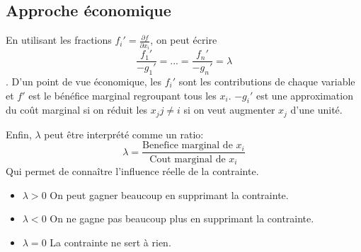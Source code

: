 \subsection{Approche économique}
En utilisant les fractions $f_i' = \frac{\partial f}{\partial x_i}$, on peut
écrire $$ \frac{f_1'}{-g_1'} = ... = \frac{f_n'}{-g_n'} = \lambda $$.
D'un point de vue économique, les $f_i'$ sont les contributions de chaque
variable et $f'$ est le bénéfice marginal regroupant tous les $x_i$.
$-g_i'$ est une approximation du coût marginal si on réduit les $x_j j\neq i$
si on veut augmenter $x_j$ d'une unité.

Enfin, $\lambda$ peut être interprété comme un ratio:
$$\lambda = \frac{\textrm{Benefice marginal de }x_i}{\textrm{Cout marginal de }x_i}$$
Qui permet de connaître l'influence réelle de la contrainte.
\begin{itemize}
\item $\lambda > 0$ On peut gagner beaucoup en supprimant la contrainte.
\item $\lambda < 0$ On ne gagne pas beaucoup plus en supprimant la contrainte.
\item $\lambda = 0$ La contrainte ne sert à rien.
\end{itemize}

